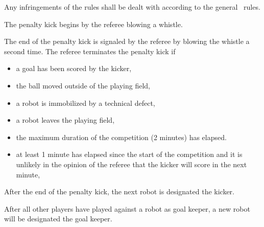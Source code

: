 \documentclass[12pt]{hurocup}
\begin{document}
\begin{lawlist}[PK]
\item Any infringements of the rules shall be dealt with according to
the general \HuroCup\ rules.

\item The penalty kick begins by the referee blowing a whistle.

\item The end of the penalty kick is signaled by the referee by
  blowing the whistle a second time.
  The referee terminates the penalty kick if
  \begin{itemize}
  \item a goal has been scored by the kicker,
  \item the ball moved outside of the playing field,
  \item a robot is immobilized by a technical defect,
  \item a robot leaves the playing field,
  \item the maximum duration of the competition (2 minutes) has elapsed.
  \item at least 1 minute has elapsed since the start of the
    competition and it is unlikely in the opinion of the referee that
    the kicker will score in the next minute,
  \end{itemize}

\item After the end of the penalty kick, the next robot is
  designated the kicker.

\item After all other players have played against a robot as goal keeper, a
new robot will be designated the goal keeper. 

\end{lawlist}

\label{penalty-scoring}
\end{document}
